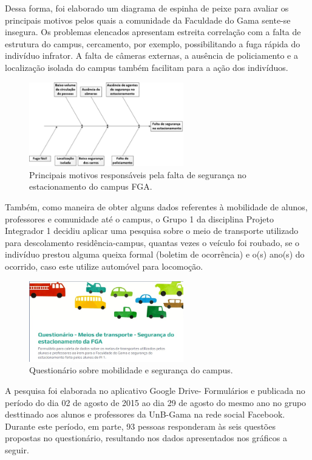 Dessa forma, foi elaborado um diagrama de espinha de peixe para avaliar os principais motivos pelos quais a comunidade da Faculdade do Gama sente-se insegura. Os problemas elencados apresentam estreita correlação com a falta de estrutura do campus, cercamento, por exemplo, possibilitando a fuga rápida do indivíduo infrator. A falta de câmeras externas, a ausência de policiamento  e a localização isolada do campus também facilitam para a ação dos indivíduos.

\begin{figure}[H]
	\centering
	\includegraphics[width=0.6\textwidth]{figuras/fishbone}
	\caption{Principais motivos responsáveis pela falta de segurança no estacionamento do campus FGA.}
	\label{img:fishbone}
\end{figure}

Também, como maneira de obter alguns dados referentes à mobilidade de alunos, professores e comunidade até o campus, o Grupo 1 da disciplina Projeto Integrador 1 decidiu aplicar uma pesquisa sobre o meio de transporte utilizado para descolamento residência-campus,   quantas vezes o veículo foi roubado, se o indivíduo prestou alguma queixa formal (boletim de ocorrência) e o(s) ano(s) do ocorrido, caso este utilize automóvel para locomoção.

\begin{figure}[H]
	\centering
	\includegraphics[width=0.6\textwidth]{figuras/questionario}
	\caption{Questionário sobre mobilidade e segurança do campus.}
	\label{img:questionario}
\end{figure}

A pesquisa foi elaborada no aplicativo Google Drive- Formulários  e publicada no período do dia 02 de agosto de 2015 ao dia 29 de agosto do mesmo ano no grupo desttinado aos alunos e professores da UnB-Gama na rede social Facebook. Durante este período, em parte, 93 pessoas responderam às seis questões propostas no questionário, resultando nos dados apresentados nos gráficos a seguir.

